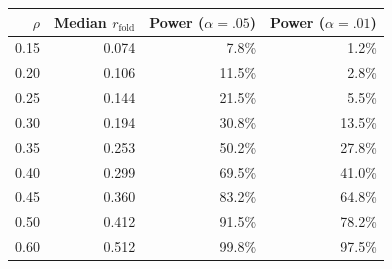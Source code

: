 \begin{tabular}{rrrr}
\toprule
$\rho$ & Median $r_{\text{fold}}$ & Power ($\alpha = .05$) & Power ($\alpha = .01$) \\
\midrule
0.15 & 0.074 & 7.8\% & 1.2\% \\
0.20 & 0.106 & 11.5\% & 2.8\% \\
0.25 & 0.144 & 21.5\% & 5.5\% \\
0.30 & 0.194 & 30.8\% & 13.5\% \\
0.35 & 0.253 & 50.2\% & 27.8\% \\
0.40 & 0.299 & 69.5\% & 41.0\% \\
0.45 & 0.360 & 83.2\% & 64.8\% \\
0.50 & 0.412 & 91.5\% & 78.2\% \\
0.60 & 0.512 & 99.8\% & 97.5\% \\
\bottomrule
\end{tabular}
